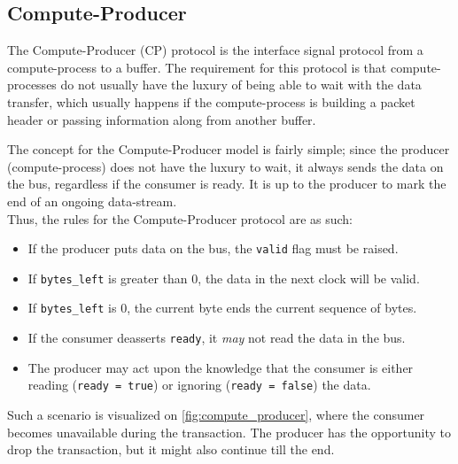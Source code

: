 \subsection{Compute-Producer}
The Compute-Producer (CP) protocol is the interface signal protocol from a
compute-process to a buffer. The requirement for this protocol is that
compute-processes do not usually have the luxury of being able to wait with the
data transfer, which usually happens if the compute-process is building a
packet header or passing information along from another buffer.

The concept for the Compute-Producer model is fairly simple; since the producer
(compute-process) does not have the luxury to wait, it always sends the data
on the bus, regardless if the consumer is ready. It is up to the producer to
mark the end of an ongoing data-stream.\\

Thus, the rules for the Compute-Producer protocol are as such:
\begin{itemize}
	\item If the producer puts data on the bus, the \texttt{valid} flag
		must be raised.
	\item If \texttt{bytes\_left} is greater than $0$, the data in the next
		clock will be valid.
	\item If \texttt{bytes\_left} is $0$, the current byte ends the
		current sequence of bytes.
	\item If the consumer deasserts \texttt{ready}, it \textit{may} not read the
		data in the bus.
	\item The producer may act upon the knowledge that the consumer is
		either reading (\texttt{ready = true}) or ignoring
		(\texttt{ready = false}) the data.
\end{itemize}

Such a scenario is visualized on \autoref{fig:compute_producer}, where the
consumer becomes unavailable during the transaction. The producer has the
opportunity to drop the transaction, but it might also continue till the end.

